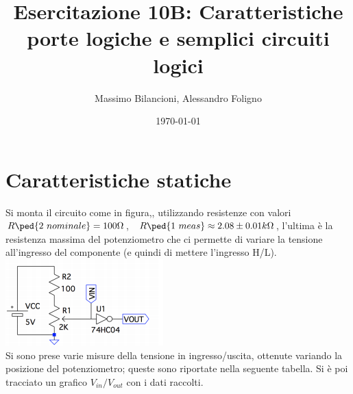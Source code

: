 \documentclass[10pt,a4paper]{article}
\date{\today}
\title{Esercitazione 10B: Caratteristiche porte logiche e semplici circuiti logici}
\author{Massimo Bilancioni, Alessandro Foligno}
\begin{document}
	
\maketitle
	
	\section{Caratteristiche statiche}
	Si monta il circuito come in figura,, utilizzando resistenze con valori  $R\ped{2~nominale}=100\Omega $,~
	$R\ped{1~meas}\approx2.08\pm0.01 k \Omega$, l'ultima è la resistenza massima del potenziometro che ci permette di variare la tensione all'ingresso del componente (e quindi di mettere l'ingresso  H/L).\\
	\includegraphics[scale=0.9]{Cattura.png}\centering
\\Si sono prese varie misure della tensione in ingresso/uscita,  ottenute variando la posizione del potenziometro; queste  sono riportate nella seguente tabella. Si è poi tracciato un grafico $V_{in}/V_{out}$ con i dati raccolti. \\
	
\end{document}
